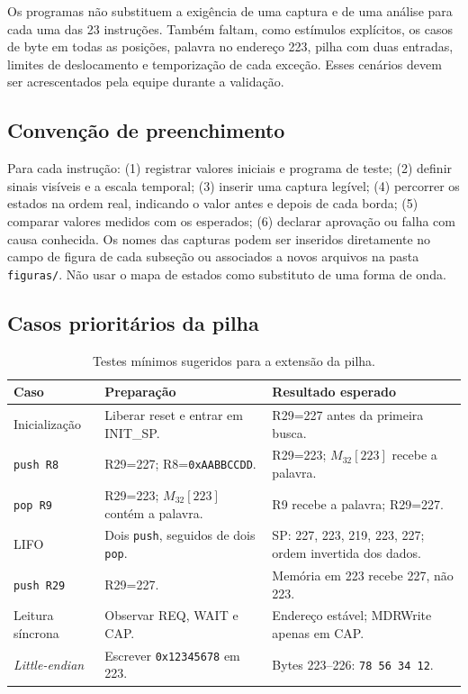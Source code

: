Os programas não substituem a exigência de uma captura e de uma análise para cada uma das 23 instruções. Também faltam, como estímulos explícitos, os casos de byte em todas as posições, palavra no endereço 223, pilha com duas entradas, limites de deslocamento e temporização de cada exceção. Esses cenários devem ser acrescentados pela equipe durante a validação.

\subsection{Convenção de preenchimento}\label{subsec:convencao-simulacao}

Para cada instrução: (1) registrar valores iniciais e programa de teste; (2) definir sinais visíveis e a escala temporal; (3) inserir uma captura legível; (4) percorrer os estados na ordem real, indicando o valor antes e depois de cada borda; (5) comparar valores medidos com os esperados; (6) declarar aprovação ou falha com causa conhecida. Os nomes das capturas podem ser inseridos diretamente no campo de figura de cada subseção ou associados a novos arquivos na pasta \texttt{figuras/}. Não usar o mapa de estados como substituto de uma forma de onda.

\subsection{Casos prioritários da pilha}\label{subsec:prioridade-pilha}

\begin{table}[H]\centering\small
\caption{Testes mínimos sugeridos para a extensão da pilha.}\label{tab:casos-pilha}
\begin{tabularx}{\linewidth}{@{}p{3.1cm}X X@{}}\toprule
Caso & Preparação & Resultado esperado \\\midrule
Inicialização & Liberar reset e entrar em INIT\_SP. & R29=227 antes da primeira busca. \\
\texttt{push R8} & R29=227; R8=\texttt{0xAABBCCDD}. & R29=223; $M_{32}[223]$ recebe a palavra. \\
\texttt{pop R9} & R29=223; $M_{32}[223]$ contém a palavra. & R9 recebe a palavra; R29=227. \\
LIFO & Dois \texttt{push}, seguidos de dois \texttt{pop}. & SP: 227, 223, 219, 223, 227; ordem invertida dos dados. \\
\texttt{push R29} & R29=227. & Memória em 223 recebe 227, não 223. \\
Leitura síncrona & Observar REQ, WAIT e CAP. & Endereço estável; MDRWrite apenas em CAP. \\
\emph{Little-endian} & Escrever \texttt{0x12345678} em 223. & Bytes 223--226: \texttt{78 56 34 12}. \\\bottomrule
\end{tabularx}
\end{table}

